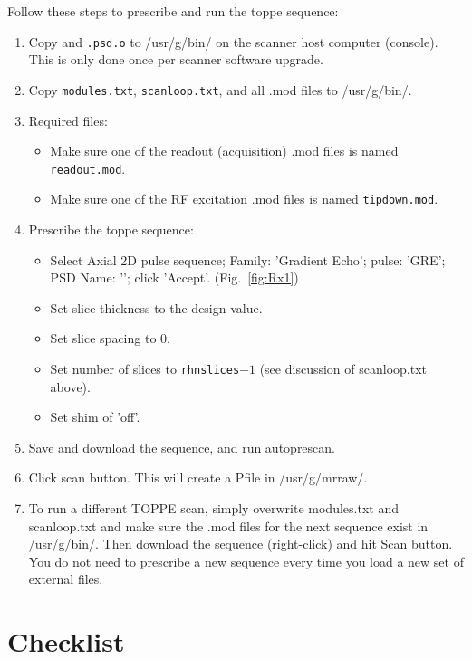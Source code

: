 Follow these steps to prescribe and run the toppe sequence:
\begin{enumerate}
	\item Copy {\tt \psdname} and {\tt \psdname.psd.o} to /usr/g/bin/ on the scanner host computer (console). This is only done once per scanner software upgrade.
	\item Copy {\tt modules.txt}, {\tt scanloop.txt}, and all .mod files to /usr/g/bin/.
	\item Required files:
	\begin{itemize}
		\item Make sure one of the readout (acquisition) .mod files is named {\tt readout.mod}.
		\item Make sure one of the RF excitation .mod files is named {\tt tipdown.mod}.
	\end{itemize}
	\item Prescribe the toppe sequence:
\begin{itemize}
	\item Select Axial 2D pulse sequence; Family: 'Gradient Echo'; pulse: 'GRE'; PSD Name: '\psdname'; click 'Accept'. (Fig.~\ref{fig:Rx1})
	\item Set slice thickness to the design value.
	\item Set slice spacing to 0.
	\item Set number of slices to {\tt rhnslices}$-1$ (see discussion of scanloop.txt above).
	\item Set shim of 'off'.
\end{itemize}
	\item Save and download the sequence, and run autoprescan.
	\item Click scan button. This will create a Pfile in /usr/g/mrraw/.
	\item To run a different TOPPE scan, simply overwrite modules.txt and scanloop.txt and make sure the .mod files for the next sequence exist in /usr/g/bin/. Then download the sequence (right-click) and hit Scan button. You do not need to prescribe a new sequence every time you load a new set of external files.
\end{enumerate}



\section{Checklist}

